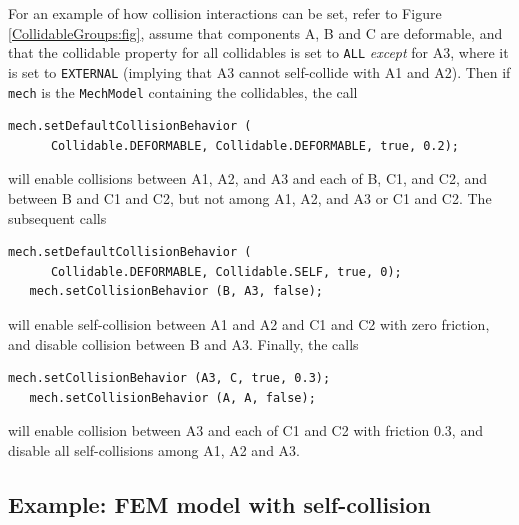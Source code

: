 For an example of how collision interactions can be set, refer to
Figure \ref{CollidableGroups:fig}, assume that components A, B and C
are deformable, and that the {\sf collidable} property for all
collidables is set to {\tt ALL} {\it except} for A3, where it is set
to {\tt EXTERNAL} (implying that A3 cannot self-collide with A1 and
A2). Then if {\tt mech} is the {\tt MechModel} containing the
collidables, the call
%
\begin{lstlisting}[]
   mech.setDefaultCollisionBehavior (
      Collidable.DEFORMABLE, Collidable.DEFORMABLE, true, 0.2);
\end{lstlisting}
%
will enable collisions between A1, A2, and A3 and each of B, C1, and
C2, and between B and C1 and C2, but not among A1, A2, and A3 or C1
and C2. The subsequent calls
%
\begin{lstlisting}[]
   mech.setDefaultCollisionBehavior (
      Collidable.DEFORMABLE, Collidable.SELF, true, 0);
   mech.setCollisionBehavior (B, A3, false);
\end{lstlisting}
%
will enable self-collision between A1 and A2 and C1 and C2 with zero
friction, and disable collision between B and A3.
Finally, the calls
\begin{lstlisting}[]
   mech.setCollisionBehavior (A3, C, true, 0.3);
   mech.setCollisionBehavior (A, A, false);
\end{lstlisting}
%
will enable collision between A3 and each of C1 and C2 with friction
0.3, and disable all self-collisions among A1, A2 and A3.

\subsection{Example: FEM model with self-collision}

